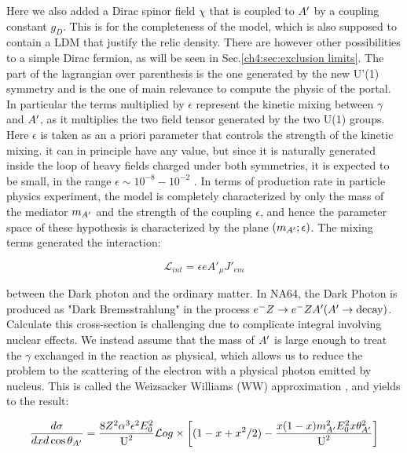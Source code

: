 Here we also added a Dirac spinor field $\chi$ that is coupled to $A'$ by a coupling constant $g_D$. This is for the completeness of the model, which is also supposed to contain a LDM that justify the relic density. There are however other possibilities to a simple Dirac fermion, as will be seen in Sec.\ref{ch4:sec:exclusion limits}. The part of the lagrangian over parenthesis is the one generated by the new U'(1) symmetry and is the one of main relevance to compute the physic of the portal. In particular the terms multiplied by $\epsilon$ represent the kinetic mixing between $\gamma$ and $A'$, as it multiplies the two field tensor generated by the two U(1) groups. Here $\epsilon$ is taken as an a priori parameter that controls the strength of the kinetic mixing. it can in principle have any value, but since it is naturally generated inside the loop of heavy fields charged under both symmetries, it is expected to be small, in the range $\epsilon \sim 10^{-8} - 10^{-2}$ \cite{jdb}. In terms of production rate in particle physics experiment, the model is completely characterized by only the mass of the mediator $m_{A'}$ and the strength of the coupling $\epsilon$, and hence the parameter space of these hypothesis  is characterized by the plane $(m_{A'};\epsilon)$. The mixing terms generated the interaction:

\begin{equation}
  \label{eq:dm-interaction}
  \mathcal{L}_{int} = \epsilon e A'_{\mu}J'_{em}
\end{equation}

between the Dark photon and the ordinary matter. In NA64, the Dark Photon is produced as "Dark Bremsstrahlung" in the process $e^- Z \to e^- Z A'(A' \to \textrm{decay})$. Calculate this cross-section is challenging due to complicate integral involving nuclear effects. We instead assume that the mass of $A'$ is large enough to treat the $\gamma$ exchanged in the reaction as physical, which allows us to reduce the problem to the scattering of the electron with a physical photon emitted by nucleus. This is called the Weizsacker Williams (WW) approximation \cite{Kim:1973he}, and yields to the result:

\begin{equation}
  \label{eq:dm-diff-cross}
  \frac{d\sigma}{dxd\cos{\theta_{A'}}} = \frac{8 Z^2 \alpha^3 \epsilon^2 E^2_0}{\textrm{U}^2} \mathcal{L}og \times \left[ (1 - x + x^2/2) - \frac{x(1-x)m^2_{A'}E^2_0 x \theta^2_{A'}}{\textrm{U}^2} \right]
\end{equation}

